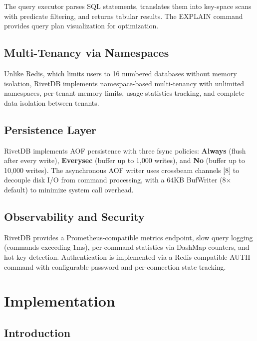 \documentclass[12pt,a4paper]{report}
\begin{document}
The query executor parses SQL statements, translates them into key-space scans with predicate filtering, and returns tabular results. The EXPLAIN command provides query plan visualization for optimization.

\section{Multi-Tenancy via Namespaces}

Unlike Redis, which limits users to 16 numbered databases without memory isolation, RivetDB implements namespace-based multi-tenancy with unlimited namespaces, per-tenant memory limits, usage statistics tracking, and complete data isolation between tenants.

\section{Persistence Layer}

RivetDB implements AOF persistence with three fsync policies: \textbf{Always} (flush after every write), \textbf{Everysec} (buffer up to 1,000 writes), and \textbf{No} (buffer up to 10,000 writes). The asynchronous AOF writer uses crossbeam channels [8] to decouple disk I/O from command processing, with a 64KB BufWriter (8$\times$ default) to minimize system call overhead.

\section{Observability and Security}

RivetDB provides a Prometheus-compatible metrics endpoint, slow query logging (commands exceeding 1ms), per-command statistics via DashMap counters, and hot key detection. Authentication is implemented via a Redis-compatible AUTH command with configurable password and per-connection state tracking.

\chapter{Implementation}

\section{Introduction}
\end{document}
